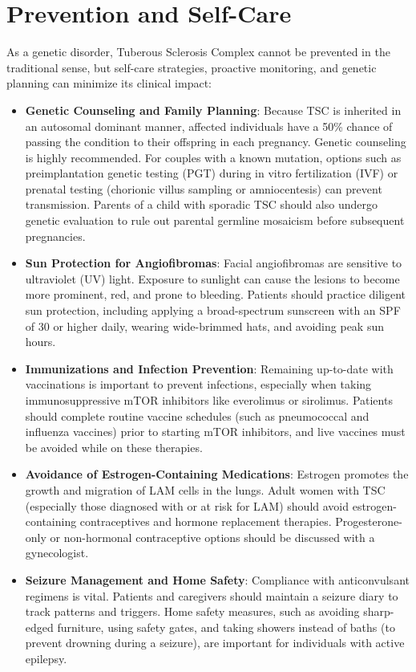 \section*{Prevention and Self-Care}
As a genetic disorder, Tuberous Sclerosis Complex cannot be prevented in the traditional sense, but self-care strategies, proactive monitoring, and genetic planning can minimize its clinical impact:
\begin{itemize}
    \item \textbf{Genetic Counseling and Family Planning}: Because TSC is inherited in an autosomal dominant manner, affected individuals have a 50\% chance of passing the condition to their offspring in each pregnancy. Genetic counseling is highly recommended. For couples with a known mutation, options such as preimplantation genetic testing (PGT) during in vitro fertilization (IVF) or prenatal testing (chorionic villus sampling or amniocentesis) can prevent transmission. Parents of a child with sporadic TSC should also undergo genetic evaluation to rule out parental germline mosaicism before subsequent pregnancies.
    \item \textbf{Sun Protection for Angiofibromas}: Facial angiofibromas are sensitive to ultraviolet (UV) light. Exposure to sunlight can cause the lesions to become more prominent, red, and prone to bleeding. Patients should practice diligent sun protection, including applying a broad-spectrum sunscreen with an SPF of 30 or higher daily, wearing wide-brimmed hats, and avoiding peak sun hours.
    \item \textbf{Immunizations and Infection Prevention}: Remaining up-to-date with vaccinations is important to prevent infections, especially when taking immunosuppressive mTOR inhibitors like everolimus or sirolimus. Patients should complete routine vaccine schedules (such as pneumococcal and influenza vaccines) prior to starting mTOR inhibitors, and live vaccines must be avoided while on these therapies.
    \item \textbf{Avoidance of Estrogen-Containing Medications}: Estrogen promotes the growth and migration of LAM cells in the lungs. Adult women with TSC (especially those diagnosed with or at risk for LAM) should avoid estrogen-containing contraceptives and hormone replacement therapies. Progesterone-only or non-hormonal contraceptive options should be discussed with a gynecologist.
    \item \textbf{Seizure Management and Home Safety}: Compliance with anticonvulsant regimens is vital. Patients and caregivers should maintain a seizure diary to track patterns and triggers. Home safety measures, such as avoiding sharp-edged furniture, using safety gates, and taking showers instead of baths (to prevent drowning during a seizure), are important for individuals with active epilepsy.

\end{itemize}
